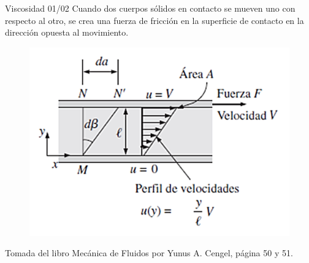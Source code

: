 
\begin{frame}{Viscosidad 01/02}
\justifying
Cuando dos cuerpos sólidos en contacto se mueven uno con respecto al otro, se crea una fuerza de fricción en la superficie de contacto en la dirección opuesta al movimiento.
\begin{figure}[H]
\centering
\includegraphics[scale=0.4]{Section_Files/picmanuel/19.png}
\label{fig: Figura2-21}
\end{figure}
{\tiny Tomada del libro Mecánica de Fluidos por Yunus A. Cengel, página 50 y 51.}
\end{frame}

